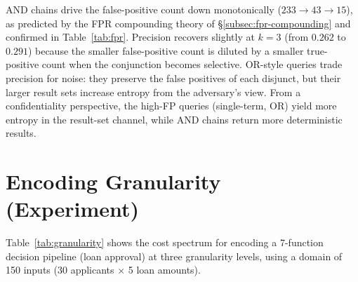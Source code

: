 \documentclass[conference]{IEEEtran}
\theoremstyle{definition}
\theoremstyle{plain}
\theoremstyle{remark}
\begin{document}
\begin{table}[ht]
\centering
\caption{Boolean search on 20 Newsgroups (5,000 documents, $n=5$
seeds).  All recalls except OR-style queries are 1.0 because cipher
Booleans have $p_F = 0.90$ ($\eta = 0.10$ false-negative rate per
clause) but the True region admits all true positives at the
$p_T = 0.05$ noise-decode rate.  OR queries lose recall when noise
matches the OR pattern.}
\label{tab:boolean}
\end{table}

AND chains drive the false-positive count down monotonically
($233 \to 43 \to 15$), as predicted by the FPR compounding theory of
\S\ref{subsec:fpr-compounding} and confirmed in
Table~\ref{tab:fpr}.  Precision recovers slightly at $k=3$ (from
$0.262$ to $0.291$) because the smaller false-positive count is
diluted by a smaller true-positive count when the conjunction
becomes selective.  OR-style queries trade precision for noise:
they preserve the false positives of each disjunct, but their
larger result sets increase entropy from the adversary's view.
From a confidentiality perspective, the high-FP queries
(single-term, OR) yield more entropy in the result-set channel,
while AND chains return more deterministic results.



\section{Encoding Granularity (Experiment)}
\label{app:granexp}

Table~\ref{tab:granularity} shows the cost spectrum for encoding
a 7-function decision pipeline (loan approval) at three granularity
levels, using a domain of 150 inputs (30 applicants $\times$ 5 loan
amounts).
\end{document}

